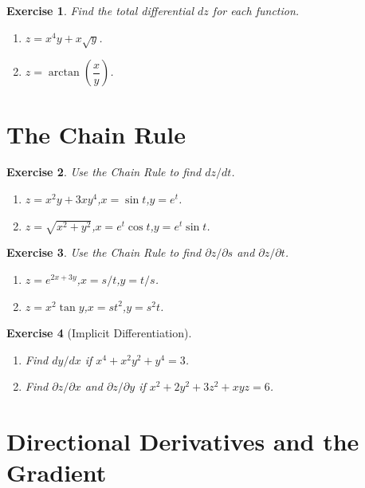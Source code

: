 \documentclass[12pt,a4paper]{article}
\theoremstyle{exercise}
\newtheorem{exercise}{Exercise}[section]
\theoremstyle{hint}
\begin{document}
\begin{exercise}
Find the total differential $dz$ for each function.
\begin{enumerate}[label=(\alph*)]
  \item $z=x^{4}y+x\sqrt{y}$.
  \item $z=\arctan\!\left(\dfrac{x}{y}\right)$.
\end{enumerate}
\end{exercise}

\section{The Chain Rule}

\begin{exercise}
Use the Chain Rule to find $dz/dt$.
\begin{enumerate}[label=(\alph*)]
  \item $z=x^{2}y+3xy^{4}$,\quad $x=\sin t$,\quad $y=e^{t}$.
  \item $z=\sqrt{x^{2}+y^{2}}$,\quad $x=e^{t}\cos t$,\quad $y=e^{t}\sin t$.
\end{enumerate}
\end{exercise}

\begin{exercise}
Use the Chain Rule to find $\partial z/\partial s$ and
$\partial z/\partial t$.
\begin{enumerate}[label=(\alph*)]
  \item $z=e^{2x+3y}$,\quad $x=s/t$,\quad $y=t/s$.
  \item $z=x^{2}\tan y$,\quad $x=st^{2}$,\quad $y=s^{2}t$.
\end{enumerate}
\end{exercise}

\begin{exercise}[Implicit Differentiation]
\begin{enumerate}[label=(\alph*)]
  \item Find $dy/dx$ if $x^{4}+x^{2}y^{2}+y^{4}=3$.
  \item Find $\partial z/\partial x$ and $\partial z/\partial y$ if
        $x^{2}+2y^{2}+3z^{2}+xyz=6$.
\end{enumerate}
\end{exercise}

\section{Directional Derivatives and the Gradient}
\end{document}
